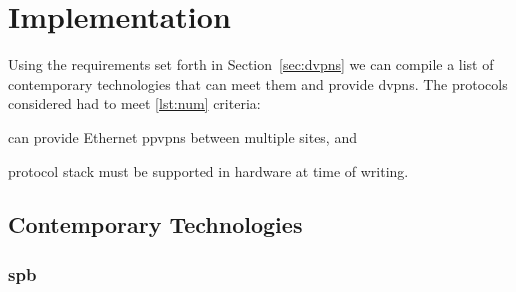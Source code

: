 \section{Implementation} %
\label{sec:implementation}

Using the requirements set forth in Section~\ref{sec:dvpns} we can compile a list of contemporary technologies that can meet them and provide \acp{dvpn}. The protocols considered had to meet \ref{lst:num} criteria:
\begin{inparaenum}[\itshape 1\upshape)]
	\item can provide Ethernet \acp{ppvpn} between multiple sites, and
	\item protocol stack must be supported in hardware at time of writing.
	\label{lst:num}
\end{inparaenum}

\subsection{Contemporary Technologies} %
\label{sub:contemporary_technologies}

%

\subsubsection{\acs{spb}} %
\label{ssub:spb}

